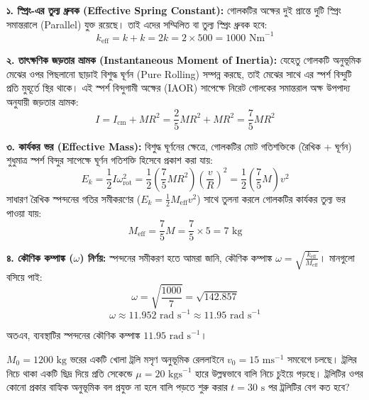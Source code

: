 \documentclass[12pt, a4paper]{article}
\begin{document}
{\begin{tcolorbox}[solutionbox={সমাধান (Solution)}]
\vspace{0.5em}
\textbf{১. স্প্রিং-এর তুল্য ধ্রুবক (Effective Spring Constant):}
গোলকটির অক্ষের দুই প্রান্তে দুটি স্প্রিং সমান্তরালে (Parallel) যুক্ত রয়েছে। তাই এদের সম্মিলিত বা তুল্য স্প্রিং ধ্রুবক হবে:
$$k_{\text{eff}} = k + k = 2k = 2 \times 500 = 1000\text{ Nm}^{-1}$$

\vspace{0.5em}
\textbf{২. তাৎক্ষণিক জড়তার ভ্রামক (Instantaneous Moment of Inertia):}
যেহেতু গোলকটি অনুভূমিক মেঝের ওপর পিছলানো ছাড়াই বিশুদ্ধ ঘূর্ণন (Pure Rolling) সম্পন্ন করছে, তাই মেঝের সাথে এর স্পর্শ বিন্দুটি প্রতি মুহূর্তে স্থির থাকে। এই স্পর্শ বিন্দুগামী অক্ষের (IAOR) সাপেক্ষে নিরেট গোলকের সমান্তরাল অক্ষ উপপাদ্য অনুযায়ী জড়তার ভ্রামক:
$$I = I_{\text{cm}} + M R^2 = \frac{2}{5} M R^2 + M R^2 = \frac{7}{5} M R^2$$

\vspace{0.5em}
\textbf{৩. কার্যকর ভর (Effective Mass):}
বিশুদ্ধ ঘূর্ণনের ক্ষেত্রে, গোলকটির মোট গতিশক্তিকে (রৈখিক + ঘূর্ণন) শুধুমাত্র স্পর্শ বিন্দুর সাপেক্ষে ঘূর্ণন গতিশক্তি হিসেবে প্রকাশ করা যায়:
$$E_k = \frac{1}{2} I \omega_{\text{rot}}^2 = \frac{1}{2} \left(\frac{7}{5} M R^2\right) \left(\frac{v}{R}\right)^2 = \frac{1}{2} \left(\frac{7}{5} M\right) v^2$$
সাধারণ রৈখিক স্পন্দনের গতির সমীকরণের ($E_k = \frac{1}{2} M_{\text{eff}} v^2$) সাথে তুলনা করলে গোলকটির কার্যকর তুল্য ভর পাওয়া যায়:
$$M_{\text{eff}} = \frac{7}{5} M = \frac{7}{5} \times 5 = 7\text{ kg}$$

\vspace{0.5em}
\textbf{৪. কৌণিক কম্পাঙ্ক ($\omega$) নির্ণয়:}
স্পন্দনের সমীকরণ হতে আমরা জানি, কৌণিক কম্পাঙ্ক $\omega = \sqrt{\frac{k_{\text{eff}}}{M_{\text{eff}}}}$।
মানগুলো বসিয়ে পাই:
$$\omega = \sqrt{\frac{1000}{7}} = \sqrt{142.857}$$
$$\omega \approx 11.952\text{ rad s}^{-1} \approx 11.95\text{ rad s}^{-1}$$

অতএব, ব্যবস্থাটির স্পন্দনের কৌণিক কম্পাঙ্ক $11.95\text{ rad s}^{-1}$।
\end{tcolorbox}
\vspace{1em}

\begin{tcolorbox}[questionbox={প্রশ্ন (Question) 33}]
\noindent
$M_0 = 1200\text{ kg}$ ভরের একটি খোলা ট্রলি মসৃণ অনুভূমিক রেললাইনে $v_0 = 15\text{ ms}^{-1}$ সমবেগে চলছে। ট্রলির নিচে থাকা একটি ছিদ্র দিয়ে প্রতি সেকেন্ডে $\mu = 20\text{ kgs}^{-1}$ হারে উল্লম্বভাবে বালি নিচে চুইয়ে পড়ছে। ট্রলিটির ওপর কোনো প্রকার বাহ্যিক অনুভূমিক বল প্রযুক্ত না হলে বালি পড়তে শুরু করার $t = 30\text{ s}$ পর ট্রলিটির বেগ কত হবে?


\end{tcolorbox}}
\end{document}
